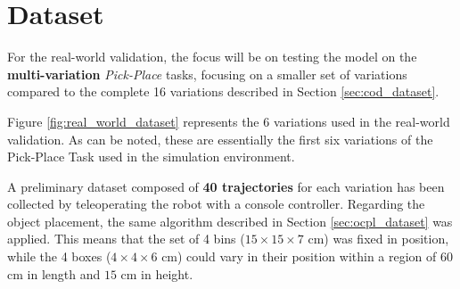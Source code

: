 \section{Dataset}
\label{sec:real_world_dataset}
For the real-world validation, the focus will be on testing the model on the \textbf{multi-variation} \textit{Pick-Place} tasks, focusing on a smaller set of variations compared to the complete 16 variations described in Section \ref{sec:cod_dataset}.



Figure \ref{fig:real_world_dataset} represents the 6 variations used in the real-world validation. As can be noted, these are essentially the first six variations of the Pick-Place Task used in the simulation environment.

A preliminary dataset composed of \textbf{40 trajectories} for each variation has been collected by teleoperating the robot with a console controller. Regarding the object placement, the same algorithm described in Section \ref{sec:ocpl_dataset} was applied. This means that the set of 4 bins ($15 \times 15 \times 7$ cm) was fixed in position, while the 4 boxes ($4 \times 4 \times 6$ cm) could vary in their position within a region of $60$ cm in length and $15$ cm in height. 

